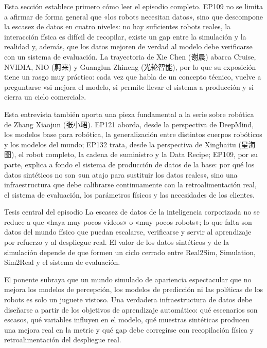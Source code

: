 \documentclass[a4paper]{article}
\begin{document}
Esta sección establece primero cómo leer el episodio completo. EP109 no se limita a afirmar de forma general que «los robots necesitan datos», sino que descompone la escasez de datos en cuatro niveles: no hay suficientes robots reales, la interacción física es difícil de recopilar, existe un gap entre la simulación y la realidad y, además, que los datos mejoren de verdad al modelo debe verificarse con un sistema de evaluación. La trayectoria de Xie Chen (谢晨) abarca Cruise, NVIDIA, NIO (蔚来) y Guanglun Zhineng (光轮智能), por lo que su exposición tiene un rasgo muy práctico: cada vez que habla de un concepto técnico, vuelve a preguntarse «si mejora el modelo, si permite llevar el sistema a producción y si cierra un ciclo comercial».

Esta entrevista también aporta una pieza fundamental a la serie sobre robótica de Zhang Xiaojun (张小珺). EP121 aborda, desde la perspectiva de DeepMind, los modelos base para robótica, la generalización entre distintos cuerpos robóticos y los modelos del mundo; EP132 trata, desde la perspectiva de Xinghaitu (星海图), el robot completo, la cadena de suministro y la Data Recipe; EP109, por su parte, explica a fondo el sistema de producción de datos de la base: por qué los datos sintéticos no son «un atajo para sustituir los datos reales», sino una infraestructura que debe calibrarse continuamente con la retroalimentación real, el sistema de evaluación, los parámetros físicos y las necesidades de los clientes.

\begin{importantbox}{Tesis central del episodio}
La escasez de datos de la inteligencia corporizada no se reduce a que «haya muy pocos videos» o «muy pocos robots»; lo que falta son datos del mundo físico que puedan escalarse, verificarse y servir al aprendizaje por refuerzo y al despliegue real. El valor de los datos sintéticos y de la simulación depende de que formen un ciclo cerrado entre Real2Sim, Simulation, Sim2Real y el sistema de evaluación.
\end{importantbox}

El ponente subraya que un mundo simulado de apariencia espectacular que no mejora los modelos de percepción, los modelos de predicción ni las políticas de los robots es solo un juguete vistoso. Una verdadera infraestructura de datos debe diseñarse a partir de los objetivos de aprendizaje automático: qué escenarios son escasos, qué variables influyen en el modelo, qué muestras sintéticas producen una mejora real en la metric y qué gap debe corregirse con recopilación física y retroalimentación del despliegue real.
\end{document}
